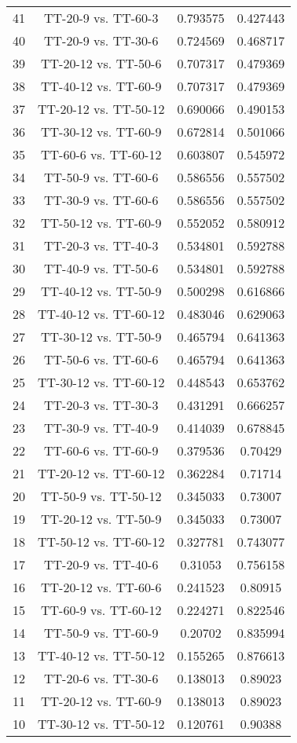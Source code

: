 \documentclass[a4paper,10pt]{article}
\begin{document}
\begin{landscape}
\begin{table}[!htp]
\begin{tabular}{cccc}
41&TT-20-9 vs. TT-60-3&0.793575&0.427443\\
40&TT-20-9 vs. TT-30-6&0.724569&0.468717\\
39&TT-20-12 vs. TT-50-6&0.707317&0.479369\\
38&TT-40-12 vs. TT-60-9&0.707317&0.479369\\
37&TT-20-12 vs. TT-50-12&0.690066&0.490153\\
36&TT-30-12 vs. TT-60-9&0.672814&0.501066\\
35&TT-60-6 vs. TT-60-12&0.603807&0.545972\\
34&TT-50-9 vs. TT-60-6&0.586556&0.557502\\
33&TT-30-9 vs. TT-60-6&0.586556&0.557502\\
32&TT-50-12 vs. TT-60-9&0.552052&0.580912\\
31&TT-20-3 vs. TT-40-3&0.534801&0.592788\\
30&TT-40-9 vs. TT-50-6&0.534801&0.592788\\
29&TT-40-12 vs. TT-50-9&0.500298&0.616866\\
28&TT-40-12 vs. TT-60-12&0.483046&0.629063\\
27&TT-30-12 vs. TT-50-9&0.465794&0.641363\\
26&TT-50-6 vs. TT-60-6&0.465794&0.641363\\
25&TT-30-12 vs. TT-60-12&0.448543&0.653762\\
24&TT-20-3 vs. TT-30-3&0.431291&0.666257\\
23&TT-30-9 vs. TT-40-9&0.414039&0.678845\\
22&TT-60-6 vs. TT-60-9&0.379536&0.70429\\
21&TT-20-12 vs. TT-60-12&0.362284&0.71714\\
20&TT-50-9 vs. TT-50-12&0.345033&0.73007\\
19&TT-20-12 vs. TT-50-9&0.345033&0.73007\\
18&TT-50-12 vs. TT-60-12&0.327781&0.743077\\
17&TT-20-9 vs. TT-40-6&0.31053&0.756158\\
16&TT-20-12 vs. TT-60-6&0.241523&0.80915\\
15&TT-60-9 vs. TT-60-12&0.224271&0.822546\\
14&TT-50-9 vs. TT-60-9&0.20702&0.835994\\
13&TT-40-12 vs. TT-50-12&0.155265&0.876613\\
12&TT-20-6 vs. TT-30-6&0.138013&0.89023\\
11&TT-20-12 vs. TT-60-9&0.138013&0.89023\\
10&TT-30-12 vs. TT-50-12&0.120761&0.90388\\

\end{tabular}
\end{table}
\end{landscape}
\end{document}
